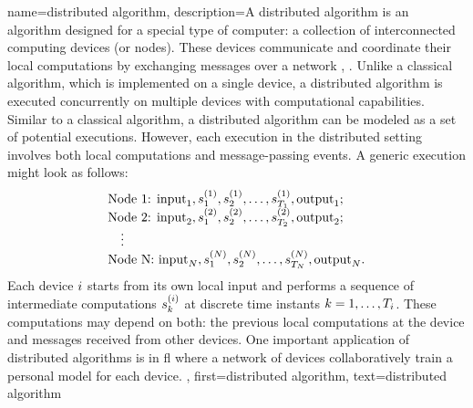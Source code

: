 {name={distributed algorithm},
	description={A distributed \gls{algorithm} is an \gls{algorithm} designed for 
		a special type of computer: a collection of interconnected computing devices (or nodes). 
		These devices communicate and coordinate their local computations by exchanging 
		messages over a network \cite{IntroDistAlg}, \cite{ParallelDistrBook}. Unlike a classical \gls{algorithm}, 
		which is implemented on a single \gls{device}, a distributed \gls{algorithm} is 
		executed concurrently on multiple \gls{device}s with computational capabilities. 
		Similar to a classical \gls{algorithm}, a distributed \gls{algorithm} can be modeled as a 
		set of potential executions. However, each execution in the distributed setting involves 
		both local computations and message-passing events. A generic execution might look as 
		follows:
		\[
		\begin{array}{l}
			\text{Node 1: } {\rm input}_1, s_1^{(1)}, s_2^{(1)}, \ldots, s_{T_1}^{(1)}, {\rm output}_1; \\
			\text{Node 2: } {\rm input}_2, s_1^{(2)}, s_2^{(2)}, \ldots, s_{T_2}^{(2)}, {\rm output}_2; \\
			\quad \vdots \\
			\text{Node N: } {\rm input}_N, s_1^{(N)}, s_2^{(N)}, \ldots, s_{T_N}^{(N)}, {\rm output}_N.
		\end{array}
		\]
		Each \gls{device} $i$ starts from its own local input and performs a sequence of 
		intermediate computations $s_{k}^{(i)}$ at discrete time instants $k = 1, \dots, T_i$. 
		These computations may depend on both: the previous local computations at the \gls{device} 
		and messages received from other \gls{device}s. One important application of distributed 
		\gls{algorithm}s is in \gls{fl} where a network of \gls{device}s collaboratively train a personal \gls{model} 
		for each \gls{device}. 
		},
	first={distributed algorithm}, text={distributed algorithm}
}


